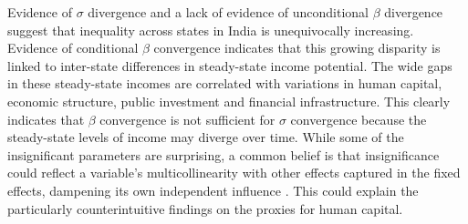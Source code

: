 \documentclass[a4paper, 11pt]{article}
\begin{document}
Evidence of $\sigma$ divergence and a lack of evidence of unconditional $\beta$ divergence suggest that inequality across states in India is unequivocally increasing.  Evidence of conditional $\beta$ convergence indicates that this growing disparity is linked to inter-state differences in steady-state income potential.  The wide gaps in these steady-state incomes are correlated with variations in human capital, economic structure, public investment and financial infrastructure.  This clearly indicates that $\beta$ convergence is not sufficient for $\sigma$ convergence because the steady-state levels of income may diverge over time.  While some of the insignificant parameters are surprising, a common belief is that insignificance could reflect a variable’s multicollinearity with other effects captured in the fixed effects, dampening its own independent influence \citep{datt_why_1998,rao_convergence_1999,ahluwalia_state-level_2000}.  This could explain the particularly counterintuitive findings on the proxies for human capital.\par
\end{document}
